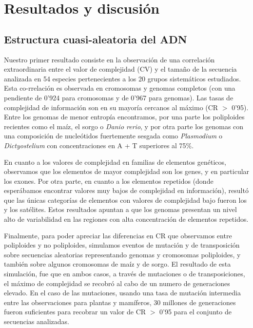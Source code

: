 \newpage
\section*{Resultados y discusión}

\subsection*{Estructura cuasi-aleatoria del ADN}

Nuestro primer resultado consiste en la observación de una correlación extraordinaria  entre el valor de complejidad (CV) y el tamaño de la secuencia analizada en 54 especies pertenecientes a los 20 grupos sistemáticos estudiados. Esta co-rrelación es observada en cromosomas y genomas completos (con una pendiente de 0'924 para cromosomas y de 0'967 para genomas). Las tasas de complejidad de información son en su mayoría cercanos al máximo (CR $>$ 0'95). Entre los genomas de menor entropía encontramos, por una parte los poliploides recientes como el maíz, el sorgo o \textit{Danio rerio}, y por otra parte los genomas con una composición de nucleótidos fuertemente sesgada como \textit{Plasmodium} o \textit{Dictyostelium} con concentraciones en A + T superiores al 75\%.

En cuanto a los valores de complejidad en familias de elementos genéticos, observamos que los elementos de mayor complejidad son los genes, y en particular los exones. Por otra parte, en cuanto a los elementos repetidos (donde esperábamos encontrar valores muy bajos de complejidad en información), resultó que las únicas categorías de elementos con valores de complejidad bajo fueron los  y los satélites. Estos resultados apuntan a que los genomas presentan un nivel alto de variabilidad en las regiones con alta concentración de elementos repetidos.

Finalmente, para poder apreciar las diferencias en CR que observamos entre poliploides y no poliploides, simulamos eventos de mutación y de transposición sobre secuencias aleatorias representando genomas y cromosomas poliploides, y también sobre algunos cromosomas de maíz y de sorgo. El resultado de esta simulación, fue que en ambos casos, a través de mutaciones o de transposiciones, el máximo de complejidad se recobró al cabo de un numero de generaciones elevado. En el caso de las mutaciones, usando una tasa de mutación intermedia entre las observaciones para plantas y mamíferos, 30 millones de generaciones fueron suficientes para recobrar un valor de CR $>$ 0'95 para el conjunto de secuencias analizadas.

